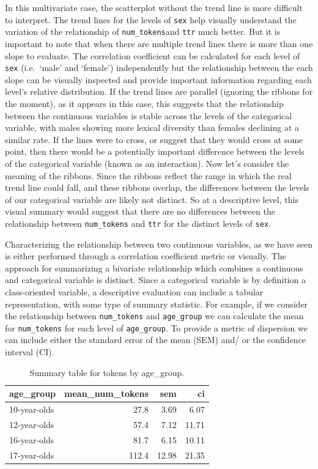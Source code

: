 \documentclass[
  letterpaper,
]{latex/krantz}
\begin{document}
In this multivariate case, the scatterplot without the trend line is
more difficult to interpret. The trend lines for the levels of
\texttt{sex} help visually understand the variation of the relationship
of \texttt{num\_tokens}and \texttt{ttr} much better. But it is important
to note that when there are multiple trend lines there is more than one
slope to evaluate. The correlation coefficient can be calculated for
each level of \texttt{sex} (i.e.~`male' and `female') independently but
the relationship between the each slope can be visually inspected and
provide important information regarding each level's relative
distribution. If the trend lines are parallel (ignoring the ribbons for
the moment), as it appears in this case, this suggests that the
relationship between the continuous variables is stable across the
levels of the categorical variable, with males showing more lexical
diversity than females declining at a similar rate. If the lines were to
cross, or suggest that they would cross at some point, then there would
be a potentially important difference between the levels of the
categorical variable (known as an interaction). Now let's consider the
meaning of the ribbons. Since the ribbons reflect the range in which the
real trend line could fall, and these ribbons overlap, the differences
between the levels of our categorical variable are likely not distinct.
So at a descriptive level, this visual summary would suggest that there
are no differences between the relationship between \texttt{num\_tokens}
and \texttt{ttr} for the distinct levels of \texttt{sex}.

Characterizing the relationship between two continuous variables, as we
have seen is either performed through a correlation coefficient metric
or visually. The approach for summarizing a bivariate relationship which
combines a continuous and categorical variable is distinct. Since a
categorical variable is by definition a class-oriented variable, a
descriptive evaluation can include a tabular representation, with some
type of summary statistic. For example, if we consider the relationship
between \texttt{num\_tokens} and \texttt{age\_group} we can calculate
the mean for \texttt{num\_tokens} for each level of \texttt{age\_group}.
To provide a metric of dispersion we can include either the standard
error of the mean (SEM) and/ or the confidence interval (CI).

\hypertarget{tbl-summarize-bivariate-cont-cat-belc}{}
\begin{table}
\caption{\label{tbl-summarize-bivariate-cont-cat-belc}Summary table for tokens by age\_group. }\tabularnewline

\centering
\begin{tabular}{lrrr}
\toprule
age\_group & mean\_num\_tokens & sem & ci\\
\midrule
10-year-olds & 27.8 & 3.69 & 6.07\\
12-year-olds & 57.4 & 7.12 & 11.71\\
16-year-olds & 81.7 & 6.15 & 10.11\\
17-year-olds & 112.4 & 12.98 & 21.35\\
\bottomrule
\end{tabular}
\end{table}
\end{document}
